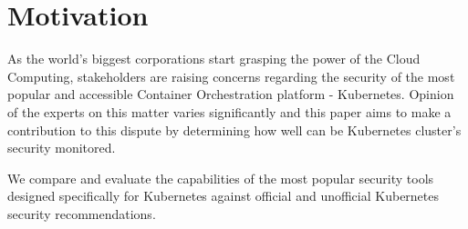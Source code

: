 \chapter*{Motivation}

As the world's biggest corporations start grasping the power of the Cloud Computing, stakeholders are raising concerns regarding the security of the most popular and accessible Container Orchestration platform - Kubernetes. Opinion of the experts on this matter varies significantly and this paper aims to make a contribution to this dispute by determining how well can be Kubernetes cluster's security monitored.

We compare and evaluate the capabilities of the most popular security tools designed specifically for Kubernetes against official and unofficial Kubernetes security recommendations.



